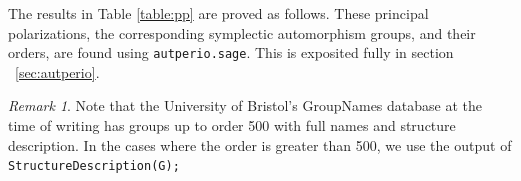 \documentclass[12pt,reqno]{amsart}
\theoremstyle{definition}
\theoremstyle{remark}
\newtheorem*{remark}{Remark}
\begin{document}
The results in Table \ref{table:pp} are proved as follows. These principal polarizations, the corresponding symplectic automorphism groups, and their orders, are found using \texttt{autperio.sage}. This is exposited fully in section ~\ref{sec:autperio}.   


\begin{remark} Note that the University of Bristol's GroupNames database at the time of writing has groups up to order 500 with full names and structure description. In the cases where the order is greater than 500, we use the output of \texttt{StructureDescription(G);}  \end{remark}

\newpage
\end{document}

